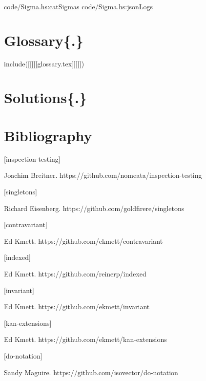 \documentclass[
  11pt,
]{book}
\newenvironment{Shaded}{}{}
\theoremstyle{nonumberplain}
\begin{document}
\href{Snip}{code/Sigma.hs:catSigmas} \href{Snip}{code/Sigma.hs:jsonLogs}

\begin{Shaded}
\begin{Highlighting}[]

\end{Highlighting}
\end{Shaded}

\hypertarget{glossary.}{%
\chapter{Glossary\{.\}}\label{glossary.}}

\noindent include({[}{[}{[}{[}{[}glossary.tex{]}{]}{]}{]}{]})

\hypertarget{solutions.}{%
\chapter{Solutions\{.\}}\label{solutions.}}

\hypertarget{bibliography}{%
\chapter{Bibliography}\label{bibliography}}

\hypertarget{bib-inspection-testing}{}
{[}inspection-testing{]}

Joachim Breitner. https://github.com/nomeata/inspection-testing

\hypertarget{bib-singletons}{}
{[}singletons{]}

Richard Eisenberg. https://github.com/goldfirere/singletons

\hypertarget{bib-contravariant}{}
{[}contravariant{]}

Ed Kmett. https://github.com/ekmett/contravariant

\hypertarget{bib-indexed}{}
{[}indexed{]}

Ed Kmett. https://github.com/reinerp/indexed

\hypertarget{bib-invariant}{}
{[}invariant{]}

Ed Kmett. https://github.com/ekmett/invariant

\hypertarget{bib-kan-extensions}{}
{[}kan-extensions{]}

Ed Kmett. https://github.com/ekmett/kan-extensions

\hypertarget{bib-do-notation}{}
{[}do-notation{]}

Sandy Maguire. https://github.com/isovector/do-notation
\end{document}
